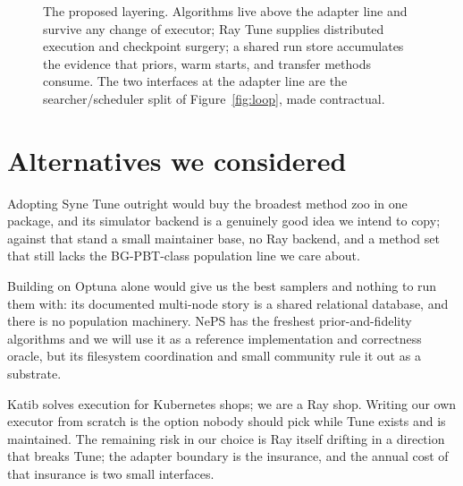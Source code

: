 \begin{figure}[t]
\centering
{}
\caption{The proposed layering. Algorithms live above the adapter line
and survive any change of executor; Ray Tune supplies distributed
execution and checkpoint surgery; a shared run store accumulates the
evidence that priors, warm starts, and transfer methods consume. The
two interfaces at the adapter line are the searcher/scheduler split of
Figure~\ref{fig:loop}, made contractual.}
\label{fig:architecture}
\end{figure}

\section{Alternatives we considered}

Adopting Syne Tune outright would buy the broadest method zoo in one
package, and its simulator backend is a genuinely good idea we intend to
copy; against that stand a small maintainer base, no Ray backend, and a
method set that still lacks the BG-PBT-class population line we care
about.

Building on Optuna alone would give us the best samplers and
nothing to run them with: its documented multi-node story is a shared
relational database, and there is no population machinery. NePS has the
freshest prior-and-fidelity algorithms and we will use it as a reference
implementation and correctness oracle, but its filesystem coordination
and small community rule it out as a substrate.

Katib solves execution
for Kubernetes shops; we are a Ray shop. Writing our own executor from
scratch is the option nobody should pick while Tune exists and is
maintained. The remaining risk in our choice is Ray itself drifting in a
direction that breaks Tune; the adapter boundary is the insurance, and
the annual cost of that insurance is two small interfaces.

